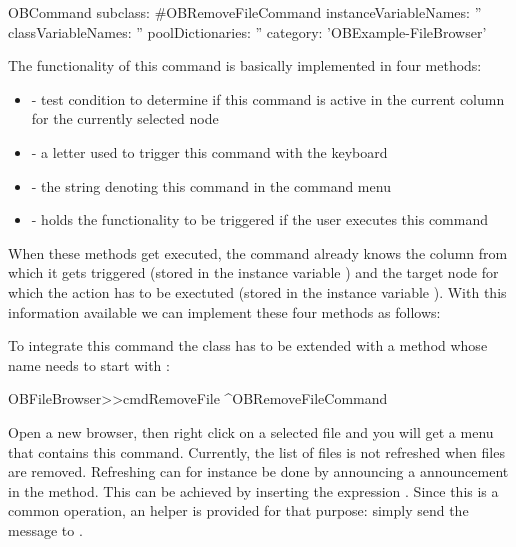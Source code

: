 \documentclass[a4paper,10pt,twoside]{book}
\begin{document}
\begin{code}{}
OBCommand subclass: #OBRemoveFileCommand
     instanceVariableNames: ''
     classVariableNames: ''
     poolDictionaries: ''
     category: 'OBExample-FileBrowser'
\end{code}


The functionality of this command is basically implemented in four methods: 

\begin{itemize}
\item {} - test condition to determine if this command is active in the current column for the currently selected node 
\item {} - a letter used to trigger this command with the keyboard
\item {} - the string denoting this command in the command menu
\item {} - holds the functionality to be triggered if the user executes this command
\end{itemize}

When these methods get executed, the command already knows the column from which it gets triggered (stored in the instance variable ) and the target node for which the action has to be exectuted (stored in the instance variable ). With this information available we can implement these four methods as follows:


To integrate this command the class  has to be extended with a method whose name needs to start with :

\begin{code}{}
OBFileBrowser>>cmdRemoveFile
	^OBRemoveFileCommand
\end{code}

Open a new browser, then right click on a selected file and you will get a menu that contains this command. Currently, the list of files is not refreshed when files are removed. Refreshing can for instance be done by announcing a  announcement in the  method. This can be achieved by inserting the expression . Since this is a common operation, an helper is provided for that purpose: simply send the  message to .
\end{document}
